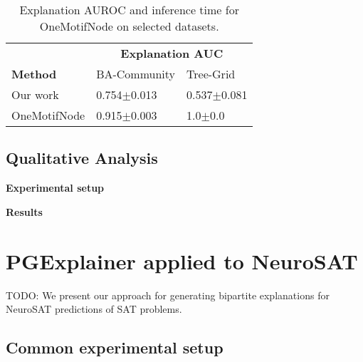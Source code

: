 \begin{table}[ht]
    \centering
    \scriptsize
    \begin{tabularx}{0.6\textwidth}{l*{2}{X}}   %
    \toprule
    \textbf{} & \multicolumn{2}{c}{\textbf{Explanation AUC}} \\
    \cmidrule{2-3}
    \textbf{Method} & BA-Community & Tree-Grid \\
    \midrule
    Our work & 0.754$\pm$0.013 & 0.537$\pm$0.081 \\
    \midrule
    OneMotifNode & 0.915$\pm$0.003 & 1.0$\pm$0.0 \\
    \bottomrule
    \end{tabularx}
    \caption[Inductive performance using one motif node for training]{Explanation AUROC and inference time for OneMotifNode on selected datasets.}
    \label{tab:allmotifnodes_selected}
\end{table}


\subsection{Qualitative Analysis}

\textbf{Experimental setup}

\textbf{Results}







\section{PGExplainer applied to NeuroSAT}

TODO: We present our approach for generating bipartite explanations for NeuroSAT \cite{} predictions of SAT problems.

\subsection{Common experimental setup}

